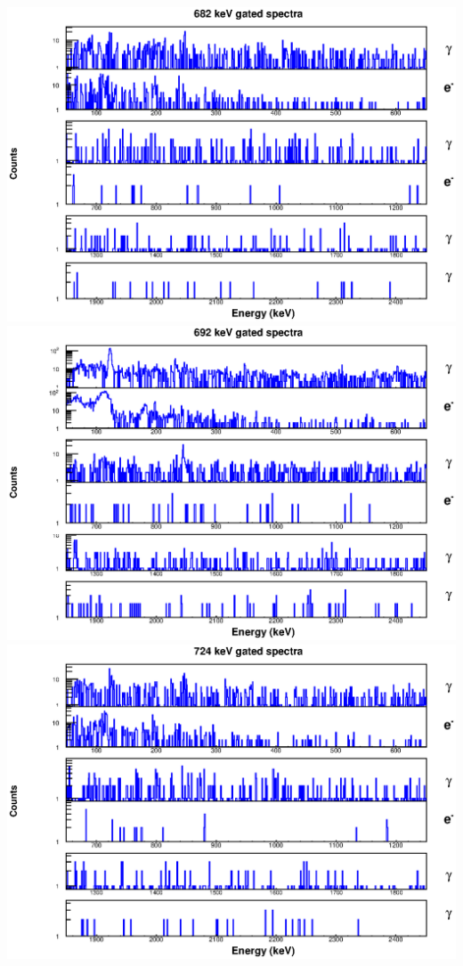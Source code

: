 \begin{landscape}
\includegraphics[scale=1.1]{154Gd_Appendix/682_combined.eps}
\includegraphics[scale=1.1]{154Gd_Appendix/692_combined.eps}
\includegraphics[scale=1.1]{154Gd_Appendix/724_combined.eps}

\end{landscape}
